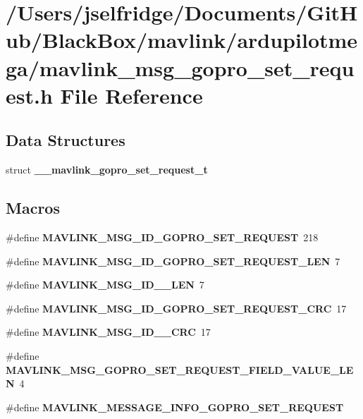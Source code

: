 \section{/\+Users/jselfridge/\+Documents/\+Git\+Hub/\+Black\+Box/mavlink/ardupilotmega/mavlink\+\_\+msg\+\_\+gopro\+\_\+set\+\_\+request.h File Reference}
\label{mavlink__msg__gopro__set__request_8h}
\subsection*{Data Structures}
\begin{DoxyCompactItemize}
\item 
struct \textbf{ \+\_\+\+\_\+mavlink\+\_\+gopro\+\_\+set\+\_\+request\+\_\+t}
\end{DoxyCompactItemize}
\subsection*{Macros}
\begin{DoxyCompactItemize}
\item 
\#define \textbf{ M\+A\+V\+L\+I\+N\+K\+\_\+\+M\+S\+G\+\_\+\+I\+D\+\_\+\+G\+O\+P\+R\+O\+\_\+\+S\+E\+T\+\_\+\+R\+E\+Q\+U\+E\+ST}~218
\item 
\#define \textbf{ M\+A\+V\+L\+I\+N\+K\+\_\+\+M\+S\+G\+\_\+\+I\+D\+\_\+\+G\+O\+P\+R\+O\+\_\+\+S\+E\+T\+\_\+\+R\+E\+Q\+U\+E\+S\+T\+\_\+\+L\+EN}~7
\item 
\#define \textbf{ M\+A\+V\+L\+I\+N\+K\+\_\+\+M\+S\+G\+\_\+\+I\+D\+\_\+\_\+\+L\+EN}~7
\item 
\#define \textbf{ M\+A\+V\+L\+I\+N\+K\+\_\+\+M\+S\+G\+\_\+\+I\+D\+\_\+\+G\+O\+P\+R\+O\+\_\+\+S\+E\+T\+\_\+\+R\+E\+Q\+U\+E\+S\+T\+\_\+\+C\+RC}~17
\item 
\#define \textbf{ M\+A\+V\+L\+I\+N\+K\+\_\+\+M\+S\+G\+\_\+\+I\+D\+\_\+\_\+\+C\+RC}~17
\item 
\#define \textbf{ M\+A\+V\+L\+I\+N\+K\+\_\+\+M\+S\+G\+\_\+\+G\+O\+P\+R\+O\+\_\+\+S\+E\+T\+\_\+\+R\+E\+Q\+U\+E\+S\+T\+\_\+\+F\+I\+E\+L\+D\+\_\+\+V\+A\+L\+U\+E\+\_\+\+L\+EN}~4
\item 
\#define \textbf{ M\+A\+V\+L\+I\+N\+K\+\_\+\+M\+E\+S\+S\+A\+G\+E\+\_\+\+I\+N\+F\+O\+\_\+\+G\+O\+P\+R\+O\+\_\+\+S\+E\+T\+\_\+\+R\+E\+Q\+U\+E\+ST}
\end{DoxyCompactItemize}
